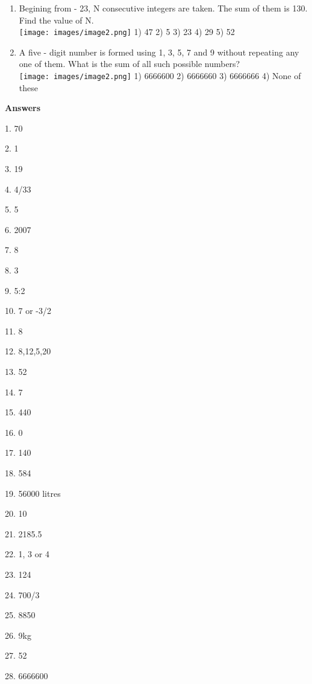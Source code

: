 \documentclass[
]{article}
\begin{document}
\begin{enumerate}
\item Begining from - 23, N consecutive integers are taken. The sum of them is 130. Find the value of N. \\
\texttt{[image: images/image2.png]} 1) 47 2) 5 3) 23 4) 29 5) 52

\item A five - digit number is formed using 1, 3, 5, 7 and 9 without repeating any one of them. What is the sum of all such possible numbers? \\
\texttt{[image: images/image2.png]} 1) 6666600 2) 6666660 3) 6666666 4) None of these

\end{enumerate}
\newpage
{\large \textbf{Answers} \\}

1. 70

2. 1

3. 19

4. 4/33

5. 5

6. 2007

7. 8

8. 3

9. 5:2

10. 7 or -3/2

11. 8

12. 8,12,5,20

13. 52

14. 7

15. 440

16. 0

17. 140

18. 584

19. 56000 litres

20. 10

21. 2185.5

22. 1, 3 or 4

23. 124

24. 700/3

25. 8850

26. 9kg


27. 52

28. 6666600
\end{document}

